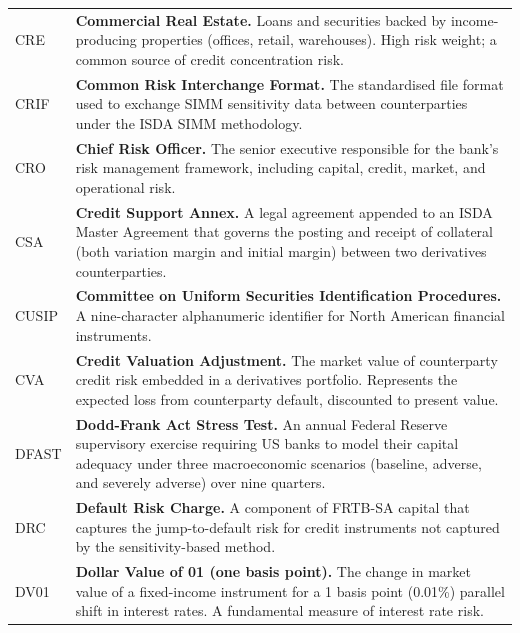 \documentclass[12pt,a4paper]{article}
\begin{document}
\begin{longtable}{p{3.2cm} p{10.8cm}}
  CRE   & \textbf{Commercial Real Estate.}
          Loans and securities backed by income-producing properties
          (offices, retail, warehouses).  High risk weight; a common
          source of credit concentration risk. \\[4pt]

  CRIF  & \textbf{Common Risk Interchange Format.}
          The standardised file format used to exchange SIMM sensitivity data
          between counterparties under the ISDA SIMM methodology. \\[4pt]

  CRO   & \textbf{Chief Risk Officer.}
          The senior executive responsible for the bank's risk management
          framework, including capital, credit, market, and operational risk. \\[4pt]

  CSA   & \textbf{Credit Support Annex.}
          A legal agreement appended to an ISDA Master Agreement that governs
          the posting and receipt of collateral (both variation margin and
          initial margin) between two derivatives counterparties. \\[4pt]

  CUSIP & \textbf{Committee on Uniform Securities Identification Procedures.}
          A nine-character alphanumeric identifier for North American financial
          instruments. \\[4pt]

  CVA   & \textbf{Credit Valuation Adjustment.}
          The market value of counterparty credit risk embedded in a derivatives
          portfolio.  Represents the expected loss from counterparty default,
          discounted to present value. \\[4pt]

  DFAST & \textbf{Dodd-Frank Act Stress Test.}
          An annual Federal Reserve supervisory exercise requiring US banks
          to model their capital adequacy under three macroeconomic scenarios
          (baseline, adverse, and severely adverse) over nine quarters. \\[4pt]

  DRC   & \textbf{Default Risk Charge.}
          A component of FRTB-SA capital that captures the jump-to-default
          risk for credit instruments not captured by the sensitivity-based
          method. \\[4pt]

  DV01  & \textbf{Dollar Value of 01 (one basis point).}
          The change in market value of a fixed-income instrument for a 1 basis
          point (0.01\%) parallel shift in interest rates.  A fundamental
          measure of interest rate risk. \\[4pt]


\end{longtable}
\end{document}
